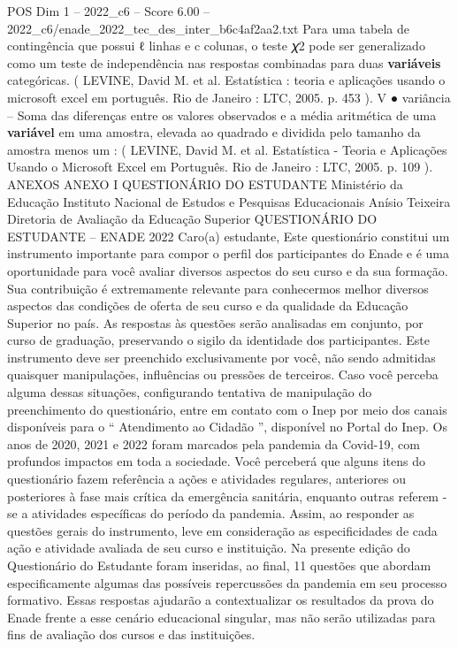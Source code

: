 \begin{textsample}{POS Dim 1 – 2022\_c6 – Score 6.00 – 2022\_c6/enade\_2022\_tec\_des\_inter\_b6c4af2aa2.txt}
Para uma tabela de contingência que possui ℓ linhas e c colunas, o teste 𝜒2 pode ser generalizado como um teste de independência nas respostas combinadas para duas \textbf{variáveis} categóricas. ( LEVINE, David M. et al.
Estatística : teoria e aplicações usando o microsoft excel em português.
Rio de Janeiro : LTC, 2005. p. 453 ).
V {\EmojiFont ●} variância – Soma das diferenças entre os valores observados e a média aritmética de uma \textbf{variável} em uma amostra, elevada ao quadrado e dividida pelo tamanho da amostra menos um : ( LEVINE, David M. et al.
Estatística - Teoria e Aplicações Usando o Microsoft Excel em Português.
Rio de Janeiro : LTC, 2005. p. 109 ).
ANEXOS ANEXO I QUESTIONÁRIO DO ESTUDANTE Ministério da Educação Instituto Nacional de Estudos e Pesquisas Educacionais Anísio Teixeira Diretoria de Avaliação da Educação Superior QUESTIONÁRIO DO ESTUDANTE – ENADE 2022 Caro(a) estudante, Este questionário constitui um instrumento importante para compor o perfil dos participantes do Enade e é uma oportunidade para você avaliar diversos aspectos do seu curso e da sua formação.
Sua contribuição é extremamente relevante para conhecermos melhor diversos aspectos das condições de oferta de seu curso e da qualidade da Educação Superior no país.
As respostas às questões serão analisadas em conjunto, por curso de graduação, preservando o sigilo da identidade dos participantes.
Este instrumento deve ser preenchido exclusivamente por você, não sendo admitidas quaisquer manipulações, influências ou pressões de terceiros.
Caso você perceba alguma dessas situações, configurando tentativa de manipulação do preenchimento do questionário, entre em contato com o Inep por meio dos canais disponíveis para o “ Atendimento ao Cidadão ”, disponível no Portal do Inep.
Os anos de 2020, 2021 e 2022 foram marcados pela pandemia da Covid-19, com profundos impactos em toda a sociedade.
Você perceberá que alguns itens do questionário fazem referência a ações e atividades regulares, anteriores ou posteriores à fase mais crítica da emergência sanitária, enquanto outras referem -se a atividades específicas do período da pandemia.
Assim, ao responder as questões gerais do instrumento, leve em consideração as especificidades de cada ação e atividade avaliada de seu curso e instituição.
Na presente edição do Questionário do Estudante foram inseridas, ao final, 11 questões que abordam especificamente algumas das possíveis repercussões da pandemia em seu processo formativo.
Essas respostas ajudarão a contextualizar os resultados da prova do Enade frente a esse cenário educacional singular, mas não serão utilizadas para fins de avaliação dos cursos e das instituições.

\end{textsample}
